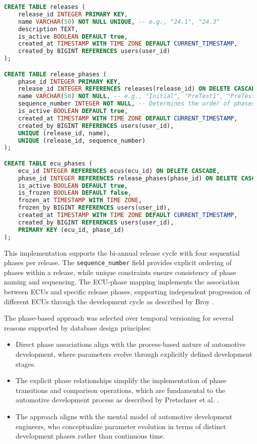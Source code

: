 \begin{lstlisting}[language=SQL, caption={Release and Phase Management Implementation}, label={lst:release-phase-tables}]
CREATE TABLE releases (
    release_id INTEGER PRIMARY KEY,
    name VARCHAR(50) NOT NULL UNIQUE, -- e.g., "24.1", "24.3"
    description TEXT,
    is_active BOOLEAN DEFAULT true,
    created_at TIMESTAMP WITH TIME ZONE DEFAULT CURRENT_TIMESTAMP,
    created_by BIGINT REFERENCES users(user_id)
);

CREATE TABLE release_phases (
    phase_id INTEGER PRIMARY KEY,
    release_id INTEGER REFERENCES releases(release_id) ON DELETE CASCADE,
    name VARCHAR(50) NOT NULL, -- e.g., "Initial", "PreTest1", "PreTest2", "Final"
    sequence_number INTEGER NOT NULL, -- Determines the order of phases
    is_active BOOLEAN DEFAULT true,
    created_at TIMESTAMP WITH TIME ZONE DEFAULT CURRENT_TIMESTAMP,
    created_by BIGINT REFERENCES users(user_id),
    UNIQUE (release_id, name),
    UNIQUE (release_id, sequence_number)
);

CREATE TABLE ecu_phases (
    ecu_id INTEGER REFERENCES ecus(ecu_id) ON DELETE CASCADE,
    phase_id INTEGER REFERENCES release_phases(phase_id) ON DELETE CASCADE,
    is_active BOOLEAN DEFAULT true,
    is_frozen BOOLEAN DEFAULT false,
    frozen_at TIMESTAMP WITH TIME ZONE,
    frozen_by BIGINT REFERENCES users(user_id),
    created_at TIMESTAMP WITH TIME ZONE DEFAULT CURRENT_TIMESTAMP,
    created_by BIGINT REFERENCES users(user_id),
    PRIMARY KEY (ecu_id, phase_id)
);
\end{lstlisting}

This implementation supports the bi-annual release cycle with four sequential phases per release. The \texttt{sequence\_number} field provides explicit ordering of phases within a release, while unique constraints ensure consistency of phase naming and sequencing. The ECU-phase mapping implements the association between ECUs and specific release phases, supporting independent progression of different ECUs through the development cycle as described by Broy \cite{broy2006challenges}.

The phase-based approach was selected over temporal versioning for several reasons supported by database design principles:

\begin{itemize}
    \item Direct phase associations align with the process-based nature of automotive development, where parameters evolve through explicitly defined development stages.
    \item The explicit phase relationships simplify the implementation of phase transitions and comparison operations, which are fundamental to the automotive development process as described by Pretschner et al. \cite{pretschner2007software}.
    \item The approach aligns with the mental model of automotive development engineers, who conceptualize parameter evolution in terms of distinct development phases rather than continuous time.
\end{itemize}

